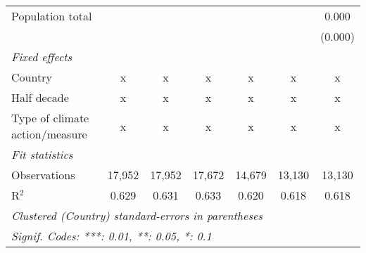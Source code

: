 \begin{tabular}{lcccccc}
   Population total                                         &                &                &                &               &              & 0.000\\   
                                                            &                &                &                &               &              & (0.000)\\   
   \emph{Fixed effects}\\
   Country                                                  & x              & x              & x              & x             & x            & x\\  
   Half decade                                              & x              & x              & x              & x             & x            & x\\  
   Type of climate action/measure                           & x              & x              & x              & x             & x            & x\\  
   \midrule \emph{Fit statistics}\\
   Observations                                             & 17,952         & 17,952         & 17,672         & 14,679        & 13,130       & 13,130\\  
   R$^2$                                                    & 0.629          & 0.631          & 0.633          & 0.620         & 0.618        & 0.618\\  
   \midrule
   \multicolumn{7}{l}{\emph{Clustered (Country) standard-errors in parentheses}}\\
   \multicolumn{7}{l}{\emph{Signif. Codes: ***: 0.01, **: 0.05, *: 0.1}}\\
\end{tabular}
\par\endgroup


